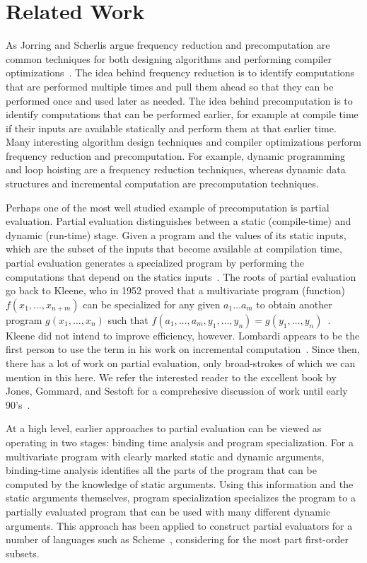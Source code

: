 \section{Related Work}

As Jorring and Scherlis argue frequency reduction and precomputation
are common techniques for both designing algorithms and performing
compiler optimizations~\cite{JS86-staging}.  The idea behind frequency
reduction is to identify computations that are performed multiple
times and pull them ahead so that they can be performed once and used
later as needed.  The idea behind precomputation is to identify
computations that can be performed earlier, for example at compile
time if their inputs are available statically and perform them at that
earlier time.  Many interesting algorithm design techniques and
compiler optimizations perform frequency reduction and precomputation.
For example, dynamic programming and loop hoisting are a frequency
reduction techniques, whereas dynamic data structures and incremental
computation are precomputation techniques.

Perhaps one of the most well studied example of precomputation is
partial evaluation.  Partial evaluation distinguishes between a static
(compile-time) and dynamic (run-time) stage. Given a program and the
values of its static inputs, which are the subset of the inputs that
become available at compilation time, partial evaluation generates a
specialized program by performing the computations that depend on the
statics inputs~\cite{jones96}.  The roots of partial evaluation go
back to Kleene, who in 1952 proved that a multivariate program
(function) $f(x_1, \ldots, x_{n+m})$ can be specialized for any given
$a_1 \ldots a_m$ to obtain another program $g(x_1, \ldots, x_n)$ such
that $f(a_1, \ldots, a_m, y_1, \ldots, y_n) = g(y_1, \ldots,
y_n)$~\cite{Kleene52}.  Kleene did not intend to improve efficiency,
however.  Lombardi appears to be the first person to use the term in
his work on incremental computation~\cite{Lombardi67}.  Since then,
there has a lot of work on partial evaluation, only broad-strokes of
which we can mention in this here.  We refer the interested reader to
the excellent book by Jones, Gommard, and Sestoft for a comprehesive
discussion of work until early 90's~\cite{JGS93}.

At a high level, earlier approaches to partial evaluation can be
viewed as operating in two stages: binding time analysis and program
specialization.  For a multivariate program with clearly marked static
and dynamic arguments, binding-time analysis identifies all the parts
of the program that can be computed by the knowledge of static
arguments. Using this information and the static arguments themselves,
program specialization specializes the program to a partially
evaluated program that can be used with many different dynamic
arguments.  This approach has been applied to construct partial
evaluators for a number of languages such as
Scheme~\cite{OB91-Similix,Consel88-Schism}, considering for the most
part first-order subsets.

